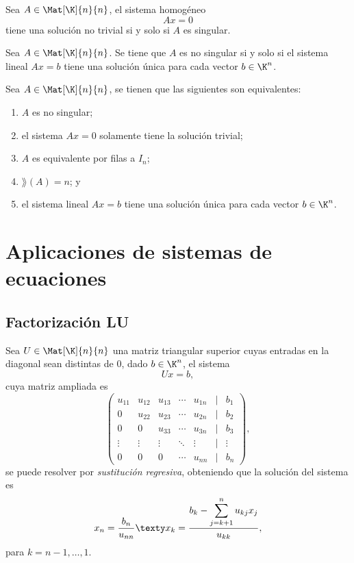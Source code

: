 \documentclass[a4,11pt]{aleph-notas}
\begin{document}
\begin{teo}
    Sea $A \in \Mat[\K]{n}{n}$, el sistema homogéneo 
    \[
        Ax = 0
    \]
    tiene una solución no trivial si y solo si $A$ es singular. 
\end{teo}

\begin{teo}
    Sea $A \in \Mat[\K]{n}{n}$. Se tiene que $A$ es no singular si y solo si el sistema lineal $Ax=b$ tiene una solución única para cada vector $b \in \K^{n}$.
\end{teo}

\begin{teo}
    Sea $A \in \Mat[\K]{n}{n}$, se tienen que las siguientes son equivalentes:
    \begin{enumerate}
    \item 
        $A$ es no singular;
    \item 
        el sistema $Ax=0$ solamente tiene la solución trivial;
    \item 
        $A$ es equivalente por filas a $I_n$;
    \item 
        $\rang(A)=n$; y 
    \item 
        el sistema lineal $Ax=b$ tiene una solución única para cada vector $b \in \K^{n}$. 
    \end{enumerate}
\end{teo}

\section{Aplicaciones de sistemas de ecuaciones}

\subsection{Factorización LU}

Sea $U\in\Mat[\K]{n}{n}$ una matriz triangular superior cuyas entradas en la diagonal sean distintas de $0$, dado $b\in\K^n$, el sistema 
\[
    Ux = b,
\]
cuya matriz ampliada es
\[
    \begin{pmatrix}
        u_{11} & u_{12} & u_{13} & \cdots & u_{1n} & | & b_1 \\
        0      & u_{22} & u_{23} & \cdots & u_{2n} & | & b_2 \\
        0      & 0      & u_{33} & \cdots & u_{3n} & | & b_3 \\
        \vdots & \vdots & \vdots & \ddots & \vdots & | & \vdots \\
        0      & 0      & 0      & \cdots & u_{nn} & | & b_n 
    \end{pmatrix},
\]
se puede resolver por \emph{sustitución regresiva}, obteniendo que la solución del sistema es
\[
    x_n = \frac{b_n}{u_{nn}}
    \texty
    x_k = \dfrac{b_k - \displaystyle\sum_{j=k+1}^n u_{kj}x_j}{u_{kk}},
\]
para $k=n-1,\ldots,1$.
\end{document}
